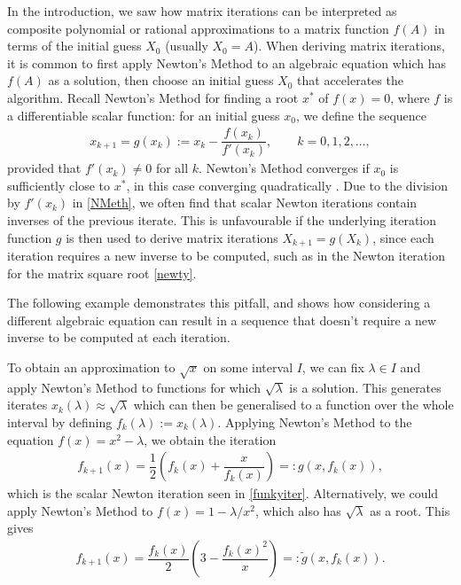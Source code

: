 In the introduction, we saw how matrix iterations can be interpreted as composite polynomial or rational approximations to a matrix function $f(A)$ in terms of the initial guess $X_0$ (usually $X_0=A$). When deriving matrix iterations, it is common to first apply Newton's Method to an algebraic equation which has $f(A)$ as a solution, then choose an initial guess $X_0$ that accelerates the algorithm. Recall Newton's Method for finding a root $x^*$ of $f(x)=0$, where $f$ is a differentiable scalar function: for an initial guess $x_0$, we define the sequence
\begin{align}
    x_{k+1}=g(x_k):=x_k - \dfrac{f(x_k)}{f'(x_k)}, \qquad k=0,1,2,\dots,\label{NMeth}
\end{align}
provided that $f'(x_k)\neq 0$ for all $k$. Newton's Method converges if $x_0$ is sufficiently close to $x^*$, in this case converging quadratically \cite[Theorem 1.8]{Suli}. Due to the division by $f'(x_k)$ in \eqref{NMeth}, we often find that scalar Newton iterations contain inverses of the previous iterate. This is unfavourable if the underlying iteration function $g$ is then used to derive matrix iterations $X_{k+1}=g(X_k)$, since each iteration requires a new inverse to be computed, such as in the Newton iteration for the matrix square root \eqref{newty}.

\bigskip{}

The following example demonstrates this pitfall, and shows how considering a different algebraic equation can result in a sequence that doesn't require a new inverse to be computed at each iteration.

\begin{ex}\label{altexample}
To obtain an approximation to $\sqrt{x}$ on some interval $I$, we can fix $\lambda \in I$ and apply Newton's Method to functions for which $\sqrt{\lambda}$ is a solution. This generates iterates $x_k(\lambda)\approx \sqrt{\lambda}$ which can then be generalised to a function over the whole interval by defining $f_k(\lambda):=x_k(\lambda)$. Applying Newton's Method to the equation $f(x)=x^2-\lambda$, we obtain the iteration
\begin{align}
    f_{k+1}(x) = \dfrac{1}{2}\left(f_k(x) + \dfrac{x}{f_k(x)}\right)=:g(x,f_k(x)), \label{iter}
\end{align}
which is the scalar Newton iteration seen in \eqref{funkyiter}. Alternatively, we could apply Newton's Method to $f(x)=1-\lambda/x^2$, which also has $\sqrt{\lambda}$ as a root. This gives
\begin{align}
    f_{k+1}(x) = \dfrac{f_k(x)}{2}\left(3 -\dfrac{f_k(x)^2}{x}\right)=:\tilde{g}(x,f_k(x)). \label{altnewt}
\end{align}
\end{ex}

